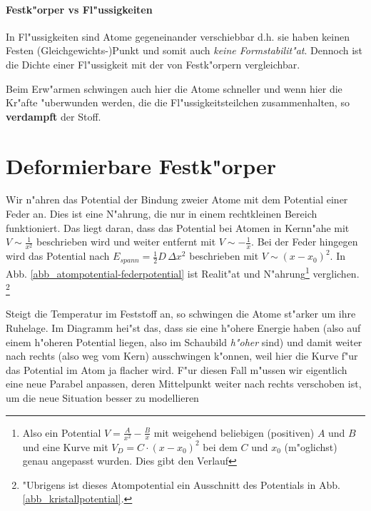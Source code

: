 \paragraph{Festk"orper vs Fl"ussigkeiten}
\label{kap_festkorper-vs-flussigkeiten}

In Fl"ussigkeiten sind Atome gegeneinander verschiebbar d.h. sie haben
keinen Festen (Gleichgewichts-)Punkt und somit auch \emph{keine
  Formstabilit"at}. Dennoch ist die Dichte einer Fl"ussigkeit mit der
von Festk"orpern vergleichbar.

Beim Erw"armen schwingen auch hier die Atome schneller und wenn hier
die Kr"afte "uberwunden werden, die die Fl"ussigkeitsteilchen
zusammenhalten, so \textbf{verdampft} der Stoff.








\section{Deformierbare Festk"orper}
\label{kap_deformierbare-festkorper}


Wir n"ahren das Potential der Bindung zweier Atome mit dem Potential
einer Feder an. Dies ist eine N"ahrung, die nur in einem rechtkleinen
Bereich funktioniert. Das liegt daran, dass das Potential bei Atomen
in Kernn"ahe mit $V \sim \frac{1}{x^2}$ beschrieben wird und weiter
entfernt mit $V \sim -\frac{1}{x}$. Bei der Feder hingegen wird das
Potential nach $E_{spann} = \frac{1}{2}D \, \Delta x^2$ beschrieben
mit $V \sim (x-x_0)^2$. In Abb. \ref{abb_atompotential-federpotential}
ist Realit"at und N"ahrung\footnote{Also ein Potential $V =
  \frac{A}{x^2} - \frac{B}{x}$ mit weigehend beliebigen (positiven)
  $A$ und $B$ und eine Kurve mit $V_D = C\cdot (x-x_0)^2$ bei dem $C$
  und $x_0$ (m"oglichst) genau angepasst wurden. Dies gibt den Verlauf}
verglichen. \footnote{"Ubrigens ist dieses Atompotential ein
  Ausschnitt des Potentials in Abb. \ref{abb_kristallpotential}.}


Steigt die Temperatur im Feststoff an, so schwingen die Atome st"arker
um ihre Ruhelage. Im Diagramm hei"st das, dass sie eine h"ohere Energie
haben (also auf einem h"oheren Potential liegen, also im Schaubild
\emph{h"oher} sind) und damit weiter nach rechts (also weg vom Kern)
ausschwingen k"onnen, weil hier die Kurve f"ur das Potential im Atom ja
flacher wird. F"ur diesen Fall m"ussen wir eigentlich eine neue Parabel
anpassen, deren Mittelpunkt weiter nach rechts verschoben ist, um die
neue Situation besser zu modellieren


